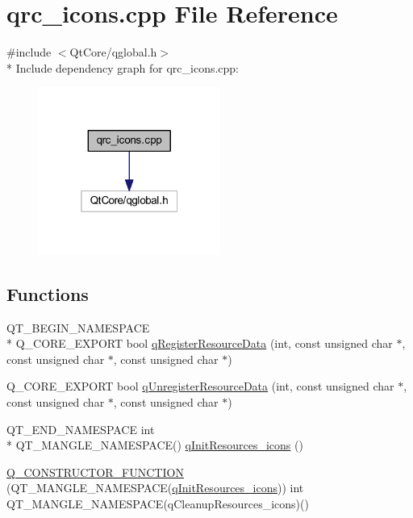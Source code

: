 \hypertarget{a00125}{\section{qrc\+\_\+icons.\+cpp File Reference}
\label{a00125}
}
{\ttfamily \#include $<$Qt\+Core/qglobal.\+h$>$}\\*
Include dependency graph for qrc\+\_\+icons.\+cpp\+:
\nopagebreak
\begin{figure}[H]
\begin{center}
\leavevmode
\includegraphics[width=169pt]{df/d91/a00335}
\end{center}
\end{figure}
\subsection*{Functions}
\begin{DoxyCompactItemize}
\item 
Q\+T\+\_\+\+B\+E\+G\+I\+N\+\_\+\+N\+A\+M\+E\+S\+P\+A\+C\+E \\*
Q\+\_\+\+C\+O\+R\+E\+\_\+\+E\+X\+P\+O\+R\+T bool \hyperlink{a00125_ab3bec3d1e679084be46edc41e4c91bc1}{q\+Register\+Resource\+Data} (int, const unsigned char $\ast$, const unsigned char $\ast$, const unsigned char $\ast$)
\item 
Q\+\_\+\+C\+O\+R\+E\+\_\+\+E\+X\+P\+O\+R\+T bool \hyperlink{a00125_ad65f8bca8010dd1fd135a28a085c6d03}{q\+Unregister\+Resource\+Data} (int, const unsigned char $\ast$, const unsigned char $\ast$, const unsigned char $\ast$)
\item 
Q\+T\+\_\+\+E\+N\+D\+\_\+\+N\+A\+M\+E\+S\+P\+A\+C\+E int \\*
Q\+T\+\_\+\+M\+A\+N\+G\+L\+E\+\_\+\+N\+A\+M\+E\+S\+P\+A\+C\+E() \hyperlink{a00125_a604a4b2c01a3fcc04d212c2aabb2171a}{q\+Init\+Resources\+\_\+icons} ()
\item 
\hyperlink{a00125_aaf557971ad1a2e498a0a798edc7cb092}{Q\+\_\+\+C\+O\+N\+S\+T\+R\+U\+C\+T\+O\+R\+\_\+\+F\+U\+N\+C\+T\+I\+O\+N} (Q\+T\+\_\+\+M\+A\+N\+G\+L\+E\+\_\+\+N\+A\+M\+E\+S\+P\+A\+C\+E(\hyperlink{a00125_a604a4b2c01a3fcc04d212c2aabb2171a}{q\+Init\+Resources\+\_\+icons})) int Q\+T\+\_\+\+M\+A\+N\+G\+L\+E\+\_\+\+N\+A\+M\+E\+S\+P\+A\+C\+E(q\+Cleanup\+Resources\+\_\+icons)()
\end{DoxyCompactItemize}



